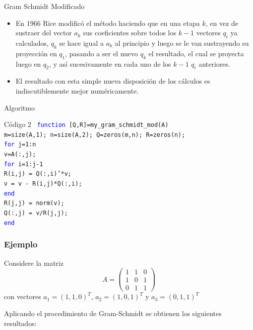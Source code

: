 \documentclass{beamer}
\begin{document}
  \begin{frame}{Gram Schmidt Modificado}
   \begin{itemize}
    \item En 1966 Rice modific\'o el m\'etodo haciendo que en una etapa $k$, en vez de sustraer del vector $a_k$ sus coeficientes sobre todos los $k-1$ vectores $q_i$ ya calculados, $q_k$ se hace igual a $a_k$ al principio y luego se le van sustrayendo su proyecci\'on en $q_1$, pasando a ser el nuevo $q_k$ el resultado, el cual se proyecta luego en $q_2$, y as\'i sucesivamente en cada uno de los $k-1$ $q_i$ anteriores. 
    \item<2-> El resultado con esta simple nueva disposici\'on de los c\'alculos es indiscutiblemente mejor num\'ericamente.
   \end{itemize}
  \end{frame}
  \begin{frame}{Algoritmo}
  \begin{block}{C\'odigo 2}
  \texttt{
  \hspace{-0.25cm}\textcolor{blue}{function} [Q,R]=my\_gram\_schmidt\_mod(A)\\
  m=size(A,1); n=size(A,2); Q=zeros(m,n); R=zeros(n);\\
  \textcolor{blue}{for} j=1:n\\
  \hspace{0.25cm} v=A(:,j);\\
  \hspace{0.25cm} \textcolor{blue}{for} i=1:j-1\\
  \hspace{0.5cm} R(i,j) = Q(:,i)'*v;\\
  \hspace{0.5cm} v = v - R(i,j)*Q(:,i);\\
  \hspace{0.25cm} \textcolor{blue}{end}\\
  \hspace{0.25cm} R(j,j) = norm(v);\\
  \hspace{0.25cm} Q(:,j) = v/R(j,j);\\
  \textcolor{blue}{end}
  }
  \end{block}
  \end{frame}
  \begin{frame}
    \frametitle{Ejemplo}
    Considere la matriz
    $$
    A = \left(\begin{array}{ccc}
      1 & 1 & 0\\
      1 & 0 & 1\\
      0 & 1 & 1
    \end{array}\right)
    $$
    con vectores $a_1 =(1, 1, 0)^T$, $a_2 =(1, 0, 1)^T$ y $a_3 =(0, 1, 1)^T$
    \vspace{1cm}

    Aplicando el procedimiento de Gram-Schmidt se obtienen los siguientes resultados:
  \end{frame}
\end{document}
